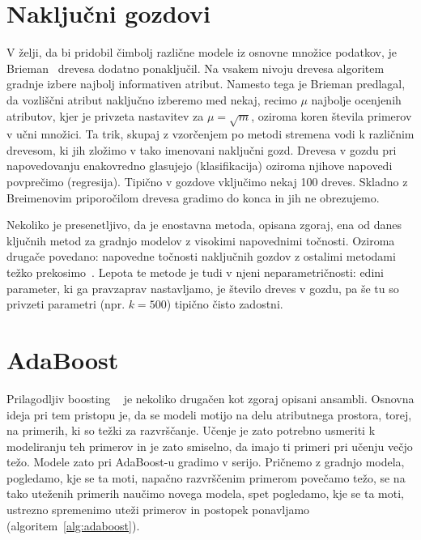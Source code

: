 \section{Naključni gozdovi}

V želji, da bi pridobil čimbolj različne modele iz osnovne množice
podatkov, je Brieman~\cite{Breiman2001} drevesa dodatno ponaključil. Na vsakem nivoju drevesa algoritem gradnje izbere najbolj informativen atribut. Namesto tega je Brieman predlagal, da vozliščni atribut naključno izberemo med nekaj, recimo $\mu$ najbolje ocenjenih atributov, kjer je privzeta nastavitev za $\mu=\sqrt{m}$, oziroma koren števila primerov v učni množici. Ta trik, skupaj z vzorčenjem po metodi stremena vodi k različnim drevesom, ki jih zložimo v tako imenovani naključni gozd. Drevesa v gozdu pri napovedovanju enakovredno glasujejo (klasifikacija) oziroma njihove napovedi povprečimo (regresija). Tipično v gozdove vključimo nekaj 100 dreves. Skladno z Breimenovim priporočilom drevesa gradimo do konca in jih ne obrezujemo.

Nekoliko je presenetljivo, da je enostavna metoda, opisana zgoraj, ena od danes ključnih metod za gradnjo modelov z visokimi napovednimi točnosti. Oziroma drugače povedano: napovedne točnosti naključnih gozdov z ostalimi metodami težko prekosimo~\cite{Fernandez-Delgado2014}. Lepota te metode je tudi v njeni neparametričnosti: edini parameter, ki ga pravzaprav nastavljamo, je število dreves v gozdu, pa še tu so privzeti parametri (npr. $k=500$) tipično čisto zadostni.

\section{AdaBoost}

Prilagodljiv boosting ~\cite{Freund1997} je nekoliko drugačen kot zgoraj opisani ansambli. Osnovna ideja pri tem pristopu je, da se modeli motijo na delu atributnega prostora, torej, na primerih, ki so težki za razvrščanje. Učenje je zato potrebno usmeriti k modeliranju teh primerov in je zato smiselno, da imajo ti primeri pri učenju večjo težo. Modele zato pri AdaBoost-u gradimo v serijo. Pričnemo z gradnjo modela, pogledamo, kje se ta moti, napačno razvrščenim primerom povečamo težo, se na tako uteženih primerih naučimo novega modela, spet pogledamo, kje se ta moti, ustrezno spremenimo uteži primerov in postopek ponavljamo (algoritem~\ref{alg:adaboost}).

